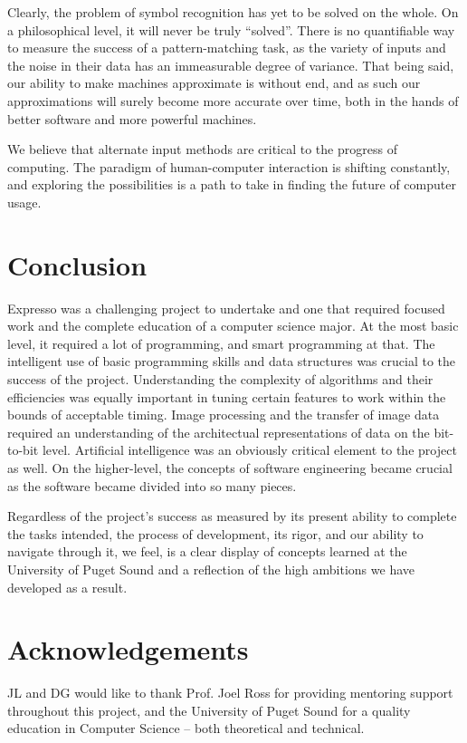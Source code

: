 \documentclass{acm_proc_article-sp}
\begin{document}
Clearly, the problem of symbol recognition has yet to be solved on the whole. On a philosophical level, it will never be truly ``solved''. There is no quantifiable way to measure the success of a pattern-matching task, as the variety of inputs and the noise in their data has an immeasurable degree of variance. That being said, our ability to make machines approximate is without end, and as such our approximations will surely become more accurate over time, both in the hands of better software and more powerful machines.

We believe that alternate input methods are critical to the progress of computing. The paradigm of human-computer interaction is shifting constantly, and exploring the possibilities is a path to take in finding the future of computer usage.

\section{Conclusion}
Expresso was a challenging project to undertake and one that required focused work and the complete education of a computer science major. At the most basic level, it required a lot of programming, and smart programming at that. The intelligent use of basic programming skills and data structures was crucial to the success of the project. Understanding the complexity of algorithms and their efficiencies was equally important in tuning certain features to work within the bounds of acceptable timing. Image processing and the transfer of image data required an understanding of the architectual representations of data on the bit-to-bit level. Artificial intelligence was an obviously critical element to the project as well. On the higher-level, the concepts of software engineering became crucial as the software became divided into so many pieces. 

Regardless of the project's success as measured by its present ability to complete the tasks intended, the process of development, its rigor, and our ability to navigate through it, we feel, is a clear display of concepts learned at the University of Puget Sound and a reflection of the high ambitions we have developed as a result.

\section{Acknowledgements}
JL and DG would like to thank Prof. Joel Ross for providing mentoring support throughout this project, and the University of Puget Sound for a quality education in Computer Science -- both theoretical and technical.



  
%
%


\balancecolumns

\end{document}
